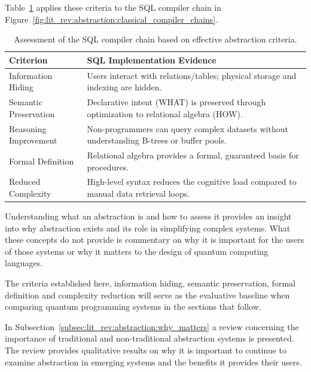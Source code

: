 Table~\ref{tab:lit_rev:abstraction:assessing_sql_compiler_chain} applies these criteria to the SQL compiler chain in Figure~\ref{fig:lit_rev:abstraction:classical_compiler_chains}.
\begin{table}[htbp]
    \centering
    \caption{Assessment of the SQL compiler chain based on effective abstraction criteria.}
    \label{tab:lit_rev:abstraction:assessing_sql_compiler_chain}
    \begin{tabularx}{\textwidth}{@{}lX@{}}
        \toprule
        \textbf{Criterion}    & \textbf{SQL Implementation Evidence}                                                      \\ \midrule
        Information Hiding    & Users interact with relations/tables; physical storage and indexing are hidden.           \\
        Semantic Preservation & Declarative intent (WHAT) is preserved through optimization to relational algebra (HOW).  \\
        Reasoning Improvement & Non-programmers can query complex datasets without understanding B-trees or buffer pools. \\
        Formal Definition     & Relational algebra provides a formal, guaranteed basis for procedures.                    \\
        Reduced Complexity    & High-level syntax reduces the cognitive load compared to manual data retrieval loops.     \\ \bottomrule
    \end{tabularx}
\end{table}

Understanding what an abstraction is and how to assess it provides an insight into why abstraction exists and its role in simplifying complex systems.
What these concepts do not provide is commentary on why it is important for the users of those systems or why it matters to the design of quantum computing languages.

The criteria established here, information hiding, semantic preservation, formal definition and complexity reduction will serve as the evaluative baseline when comparing quantum programming systems in the sections that follow.

In Subsection~\ref{subsec:lit_rev:abstraction:why_matters} a review concerning the importance of traditional and non-traditional abstraction systems is presented.
The review provides qualitative results on why it is important to continue to examine abstraction in emerging systems and the benefits it provides their users.

